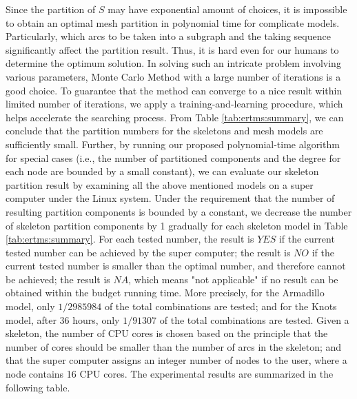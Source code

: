 Since the partition of $S$ may have exponential amount of choices, it is impossible to obtain an optimal mesh partition in polynomial time for complicate models. Particularly, which arcs to be taken into a subgraph and the taking sequence significantly affect the partition result. Thus, it is hard even for our humans to determine the optimum solution. In solving such an intricate problem involving various parameters, Monte Carlo Method with a large number of iterations is a good choice. To guarantee that the method can converge to a nice result within limited number of iterations, we apply a training-and-learning procedure, which helps accelerate the searching process. From Table \ref{tab:ertms:summary}, we can conclude that the partition numbers for the skeletons and mesh models are sufficiently small. Further, by running our proposed polynomial-time algorithm for special cases (i.e., the number of partitioned components and the degree for each node are bounded by a small constant), we can evaluate our skeleton partition result by examining all the above mentioned models on a super computer under the Linux system. Under the requirement that the number of resulting partition components is bounded by a constant, we decrease the number of skeleton partition components by 1 gradually for each skeleton model in Table \ref{tab:ertms:summary}.  For each tested number, the result is $YES$ if the current tested number can be achieved by the super computer; the result is $NO$ if the current tested number is smaller than the optimal number, and therefore cannot be achieved; the result is $NA$, which means "not applicable" if no result can be obtained within the budget running time. More precisely, for the Armadillo model, only $1/2985984$ of the total combinations are tested; and for the Knots model, after 36 hours, only $1/91307$ of the total combinations are tested. Given a skeleton, the number of CPU cores is chosen based on the principle that the number of cores should be smaller than the number of arcs in the skeleton; and that the super computer assigns an integer number of nodes to the user, where a node contains 16 CPU cores. The experimental results are summarized in the following table.

